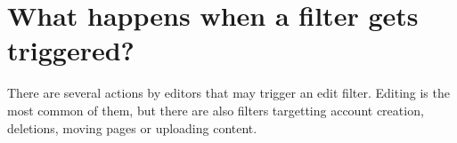 \section{What happens when a filter gets triggered?}

There are several actions by editors that may trigger an edit filter.
Editing is the most common of them, but there are also filters targetting account creation, deletions, moving pages or uploading content. %

